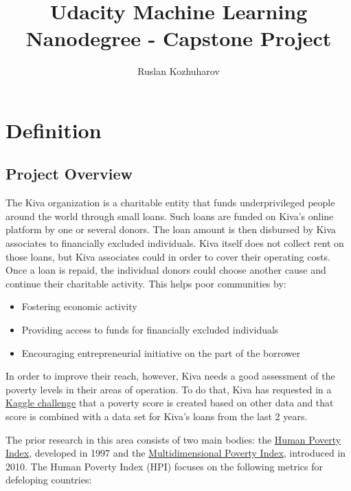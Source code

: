 \documentclass{article}
\title{Udacity Machine Learning Nanodegree - Capstone Project}
\author{Ruslan Kozhuharov}
\begin{document}
\maketitle
\tableofcontents
\newpage
{}
\setlength{\parskip}{1em}

\section{Definition}
\subsection{Project Overview}
The Kiva organization is a charitable entity that funds underprivileged people around the world through small loans. Such loans are funded on Kiva’s online platform by one or several donors. The loan amount is then disbursed by Kiva associates to financially excluded individuals. Kiva itself does not collect rent on those loans, but Kiva associates could in order to cover their operating costs. Once a loan is repaid, the individual donors could choose another cause and continue their charitable activity. This helps poor communities by:
\begin{itemize}
  \item Fostering economic activity
  \item Providing access to funds for financially excluded individuals
  \item Encouraging entrepreneurial initiative on the part of the borrower
\end{itemize}
In order to improve their reach, however, Kiva needs a good assessment of the poverty levels in their areas of operation. To do that, Kiva has requested in a \href{https://www.kaggle.com/kiva/data-science-for-good-kiva-crowdfunding}{Kaggle challenge} that a poverty score is created based on other data and that score is combined with a data set for Kiva’s loans from the last 2 years.

The prior research in this area consists of two main bodies: the \href{https://en.wikipedia.org/wiki/Human_Poverty_Index}{Human Poverty Index}, developed in 1997 and the \href{https://en.wikipedia.org/wiki/Multidimensional_Poverty_Index}{Multidimensional Poverty Index}, introduced in 2010. The Human Poverty Index (HPI) focuses on the following metrics for defeloping countries:
\end{document}
